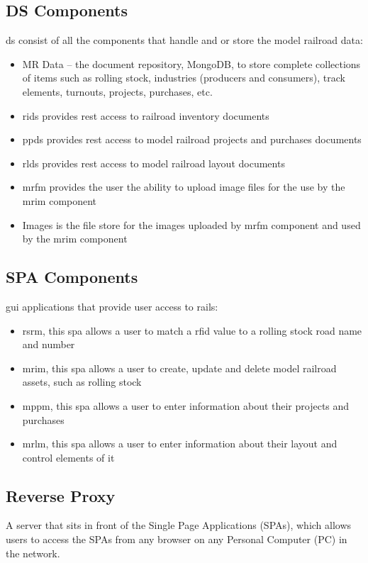 \subsection{DS Components}
\gls{ds} consist of all the components that handle and or store the model railroad data:
\begin{itemize}
  \item MR Data – the document repository, MongoDB, to store complete collections of items such as rolling stock, industries (producers and consumers), track elements, turnouts, projects, purchases, etc.
  \item \gls{rids} provides \gls{rest} access to railroad inventory documents
  \item \gls{ppds} provides \gls{rest} access to model railroad projects and purchases documents
  \item \gls{rlds} provides \gls{rest} access to model railroad layout documents
  \item \gls{mrfm} provides the user the ability to upload image files for the use by the \gls{mrim} component
  \item Images is the file store for the images uploaded by \gls{mrfm} component and used by the \gls{mrim} component
\end{itemize}
\subsection{SPA Components}
\gls{gui} applications that provide user access to \gls{rails}:
\begin{itemize}
  \item \gls{rsrm}, this \gls{spa} allows a user to match a \gls{rfid} value to a rolling stock road name and number
  \item \gls{mrim}, this \gls{spa} allows a user to create, update and delete model railroad assets, such as rolling stock
  \item \gls{mppm}, this \gls{spa} allows a user to enter information about their projects and purchases
  \item \gls{mrlm}, this \gls{spa} allows a user to enter information about their layout and control elements of it
\end{itemize}
\subsection{Reverse Proxy}
A server that sits in front of the Single Page Applications (SPAs), which allows users to access the
SPAs from any browser on any Personal Computer (PC) in the network.

